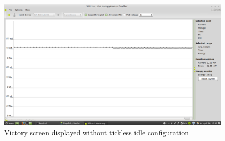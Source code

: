 \begin{figure}[H]
  \centering
  \includegraphics[clip, trim=0cm 0cm 0cm 0cm, width=12cm]{fig/Victory.png}
  \caption{Victory screen displayed without tickless idle configuration}
\end{figure}
